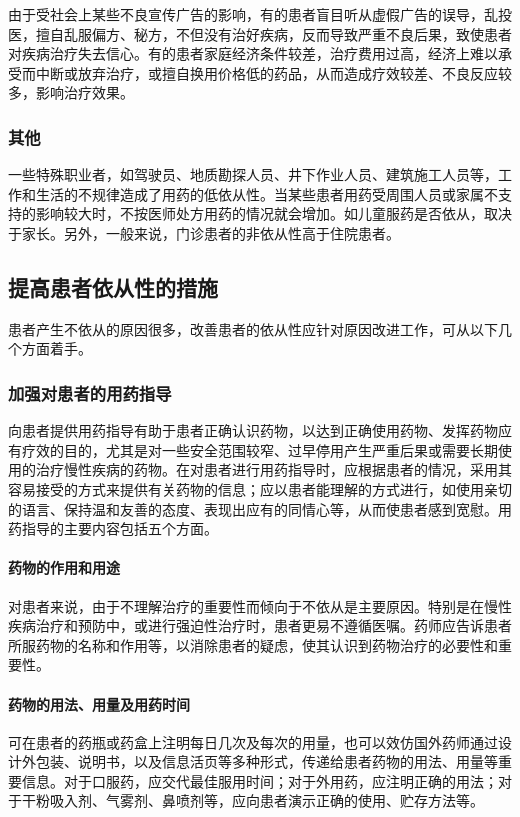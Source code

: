 由于受社会上某些不良宣传广告的影响，有的患者盲目听从虚假广告的误导，乱投医，擅自乱服偏方、秘方，不但没有治好疾病，反而导致严重不良后果，致使患者对疾病治疗失去信心。有的患者家庭经济条件较差，治疗费用过高，经济上难以承受而中断或放弃治疗，或擅自换用价格低的药品，从而造成疗效较差、不良反应较多，影响治疗效果。

\subsubsection{其他}

一些特殊职业者，如驾驶员、地质勘探人员、井下作业人员、建筑施工人员等，工作和生活的不规律造成了用药的低依从性。当某些患者用药受周围人员或家属不支持的影响较大时，不按医师处方用药的情况就会增加。如儿童服药是否依从，取决于家长。另外，一般来说，门诊患者的非依从性高于住院患者。

\subsection{提高患者依从性的措施}

患者产生不依从的原因很多，改善患者的依从性应针对原因改进工作，可从以下几个方面着手。

\subsubsection{加强对患者的用药指导}

向患者提供用药指导有助于患者正确认识药物，以达到正确使用药物、发挥药物应有疗效的目的，尤其是对一些安全范围较窄、过早停用产生严重后果或需要长期使用的治疗慢性疾病的药物。在对患者进行用药指导时，应根据患者的情况，采用其容易接受的方式来提供有关药物的信息；应以患者能理解的方式进行，如使用亲切的语言、保持温和友善的态度、表现出应有的同情心等，从而使患者感到宽慰。用药指导的主要内容包括五个方面。
\paragraph{药物的作用和用途}

对患者来说，由于不理解治疗的重要性而倾向于不依从是主要原因。特别是在慢性疾病治疗和预防中，或进行强迫性治疗时，患者更易不遵循医嘱。药师应告诉患者所服药物的名称和作用等，以消除患者的疑虑，使其认识到药物治疗的必要性和重要性。
\paragraph{药物的用法、用量及用药时间}

可在患者的药瓶或药盒上注明每日几次及每次的用量，也可以效仿国外药师通过设计外包装、说明书，以及信息活页等多种形式，传递给患者药物的用法、用量等重要信息。对于口服药，应交代最佳服用时间；对于外用药，应注明正确的用法；对于干粉吸入剂、气雾剂、鼻喷剂等，应向患者演示正确的使用、贮存方法等。
